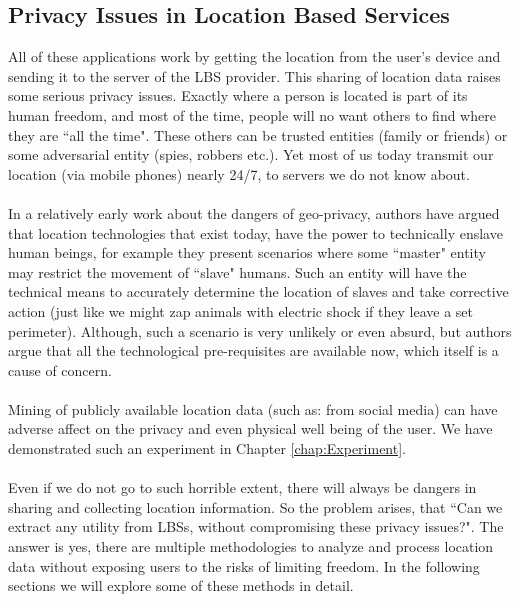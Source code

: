 \documentclass[12pt]{report}
\theoremstyle{named}
\begin{document}
\subsection{Privacy Issues in Location Based Services}
All of these applications work by getting the location from the user's device and sending it to the server of the LBS provider. This sharing of location data raises some serious privacy issues. Exactly where a person is located is part of its human freedom, and most of the time, people will no want others to find where they are ``all the time". These others can be trusted entities (family or friends) or some adversarial entity (spies, robbers etc.). Yet most of us today transmit our location (via mobile phones) nearly 24/7, to servers we do not know about.

\paragraph{}
In a relatively early work \cite{dobson2003geoslavery} about the dangers of geo-privacy, authors have argued that location technologies that exist today, have the power to technically enslave human beings, for example they present scenarios where some ``master" entity may restrict the movement of ``slave" humans. Such an entity will have the technical means to accurately determine the location of slaves and take corrective action (just like we might zap animals with electric shock if they leave a set perimeter). Although, such a scenario is very unlikely or even absurd, but authors argue that all the technological pre-requisites are available now, which itself is a cause of concern.

\paragraph{}
Mining of publicly available location data (such as: from social media) can have adverse affect on the privacy and even physical well being of the user. We have demonstrated such an experiment in Chapter \ref{chap:Experiment}. 



\paragraph{}
Even if we do not go to such horrible extent, there will always be dangers in sharing and collecting location information. So the problem arises, that ``Can we extract any utility from LBSs, without compromising these privacy issues?". The answer is yes, there are multiple methodologies to analyze and process location data without exposing users to the risks of limiting freedom.  In the following sections we will explore some of these methods in detail.
\end{document}
